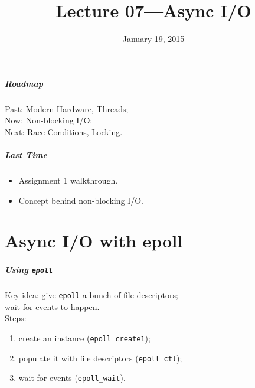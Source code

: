 \documentclass[aspectratio=43]{beamer}
\title{Lecture 07---Async I/O}
\date{January 19, 2015}
\newenvironment{changemargin}[1]{%
  \begin{list}{}{%
    \setlength{\topsep}{0pt}%
    \setlength{\leftmargin}{#1}%
    \setlength{\rightmargin}{1em}
    \setlength{\listparindent}{\parindent}%
    \setlength{\itemindent}{\parindent}%
    \setlength{\parsep}{\parskip}%
  }%
  \item[]}{\end{list}}
\begin{document}
\begin{frame}[plain]
  \titlepage
\end{frame}

\begin{frame}
  \frametitle{Roadmap}

  \Large
    \begin{changemargin}{2cm}
  Past: Modern Hardware, Threads; \\[1em]

  Now: Non-blocking I/O;\\[1em]

  Next: Race Conditions, Locking.
    \end{changemargin}
  
\end{frame}

\begin{frame}
  \frametitle{Last Time}

  \begin{changemargin}{2.5cm}
  \begin{itemize}
    \item Assignment 1 walkthrough.
    \item Concept behind non-blocking I/O.
  \end{itemize}
  \end{changemargin}
\end{frame}

\part{Async I/O with epoll}
\frame{\partpage}
\begin{frame}
  \frametitle{Using {\tt epoll}}
  \begin{changemargin}{2em}
    Key idea: give {\tt epoll} a bunch of file descriptors;\\
     \hspace*{2em}wait for events to happen.\\[1em]

     Steps:
     \begin{enumerate}
       \item create an instance ({\tt epoll\_create1});
       \item populate it with file descriptors ({\tt epoll\_ctl});
       \item wait for events ({\tt epoll\_wait}).
     \end{enumerate}
  \end{changemargin}
\end{frame}
\end{document}
